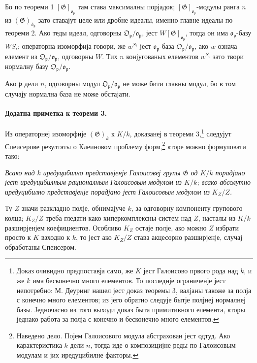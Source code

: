 \documentclass[11pt]{article}
\providecommand{\frakO}{\mathfrak{O}}
\providecommand{\frako}{\mathfrak{o}}
\providecommand{\frakp}{\mathfrak{p}}
\providecommand{\Gg}{\mathfrak{G}}
\begin{document}
Бо по теореми 1 \([\Gg]_{\frako_\frakp}\) там става максималны порјадок; \([\Gg]_{\frako_\frakp}\)-модулы ранга \(n\) из \((\Gg)_{k_\frakp}\) зато ставајут целе или дробне идеалы, именно главне идеалы по теореми 2. Ако теды идеал, одговорны \(\frakO_\frakp/\frako_\frakp\), јест \(W[\Gg]_{\frako_\frakp}\), тогда он има \(\frako_\frakp\)-базу \(WS_i\); операторна изоморфија говори, же \(w^{S_i}\) јест \(\frako_\frakp\)-база \(\frakO_\frakp/\frako_\frakp\), ако \(w\) означа елемент из \(\frakO_\frakp/\frako_\frakp\), одговорны \(W\). Тих \(n\) конјугованых елементов \(w^{S_i}\) зато твори нормалну базу \(\frakO_\frakp/\frako_\frakp\).

Ако \(\frakp\) дели \(n\), одговорны модул \(\frakO_\frakp/\frako_\frakp\) не може бити главны модул, бо в том случају нормална база не може обстајати.

\paragraph{Додатна приметка к теореми 3.}
Из операторнеј изоморфије \((\Gg)_k\) к \(K/k\), доказанеј в теореми 3,\footnote{Доказ очивидно предпоставја само, же \(K\) јест Галоисово првого рода над \(k\), и же \(k\) има бесконечно много елементов. То последнје ограниченје јест непотребно: М. Деуринг нашел јест доказ теоремы 3, валјаны такоже за полја с конечно много елементов; из јего обратно следује бытје полјнеј нормалнеј базы. Једночасно из того выходи доказ быта примитивного елемента, кторы једнако работа за полја с конечно и бесконечно много елементов.} следујут Спеисерове резултаты о Клеиновом проблему форм,\footnote{Наведено дело. Појем Галоисового модула абстрахован јест одтуд. Ако карактеристика \(k\) дели \(n\), тогда иде о композицијне реды по Галоисовым модулам и јих иредуцибилне факторы.} кторе можно формуловати тако:

\emph{Всако над \(k\) иредуцибилно представјенје Галоисовеј групы \(\Gg\) од \(K/k\) порадјано јест иредуцибилным рационалным Галоисовым модулом из \(K/k\); всако абсолутно иредуцибилно представјенје порадјано јест Галоисовым модулом из \(K_Z/Z\).}

Ту \(Z\) значи разкладно полје, обнимајуче \(k\), за одговорну компоненту групового колца; \(K_Z/Z\) треба гледати како хиперкомплексны систем над \(Z\), насталы из \(K/k\) разширјенјем коефициентов. Особливо \(K_Z\) остаје полје, ако можно \(Z\) избрати просто к \(K\) взходно к \(k\), то јест ако \(K_Z/Z\) става акцесорно разширјенје, случај обработаны Спеисером.
\end{document}
